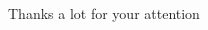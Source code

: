 \STANDARD{}
{
  \begin{columns}
    \begin{column}{0.35\textwidth}
      \begin{block}{~~~~~~Thanks a lot}
        \centering
        for your attention
      \end{block}
    \end{column}
  \end{columns}
}


